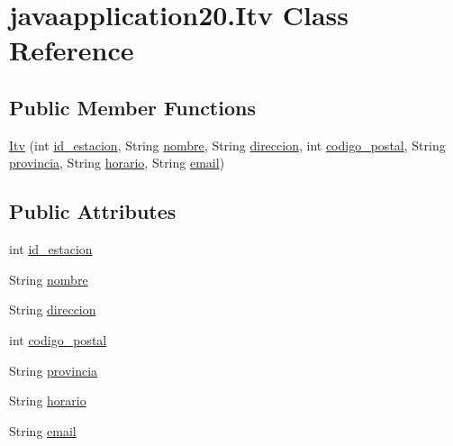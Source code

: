 \hypertarget{classjavaapplication20_1_1_itv}{}\section{javaapplication20.\+Itv Class Reference}
\label{classjavaapplication20_1_1_itv}
\subsection*{Public Member Functions}
\begin{DoxyCompactItemize}
\item 
\mbox{\hyperlink{classjavaapplication20_1_1_itv_aec26c068fcac7f03411d42f4ccf7d4f9}{Itv}} (int \mbox{\hyperlink{classjavaapplication20_1_1_itv_a53179feccb7b7c4a229bec01ae383095}{id\+\_\+estacion}}, String \mbox{\hyperlink{classjavaapplication20_1_1_itv_a434b35fff68f787e2f8749513cd16ae2}{nombre}}, String \mbox{\hyperlink{classjavaapplication20_1_1_itv_a4c9df6a015b90227f49bda05a7736b57}{direccion}}, int \mbox{\hyperlink{classjavaapplication20_1_1_itv_ab79a096724c62f0e1e39f30d6e1de9ef}{codigo\+\_\+postal}}, String \mbox{\hyperlink{classjavaapplication20_1_1_itv_aebc5fa721547c98375e99563f5482149}{provincia}}, String \mbox{\hyperlink{classjavaapplication20_1_1_itv_a851b71dd7586e47f2b1a50ece4fa0bd2}{horario}}, String \mbox{\hyperlink{classjavaapplication20_1_1_itv_ab42688c66f94923e77975aa99e0210d6}{email}})
\end{DoxyCompactItemize}
\subsection*{Public Attributes}
\begin{DoxyCompactItemize}
\item 
int \mbox{\hyperlink{classjavaapplication20_1_1_itv_a53179feccb7b7c4a229bec01ae383095}{id\+\_\+estacion}}
\item 
String \mbox{\hyperlink{classjavaapplication20_1_1_itv_a434b35fff68f787e2f8749513cd16ae2}{nombre}}
\item 
String \mbox{\hyperlink{classjavaapplication20_1_1_itv_a4c9df6a015b90227f49bda05a7736b57}{direccion}}
\item 
int \mbox{\hyperlink{classjavaapplication20_1_1_itv_ab79a096724c62f0e1e39f30d6e1de9ef}{codigo\+\_\+postal}}
\item 
String \mbox{\hyperlink{classjavaapplication20_1_1_itv_aebc5fa721547c98375e99563f5482149}{provincia}}
\item 
String \mbox{\hyperlink{classjavaapplication20_1_1_itv_a851b71dd7586e47f2b1a50ece4fa0bd2}{horario}}
\item 
String \mbox{\hyperlink{classjavaapplication20_1_1_itv_ab42688c66f94923e77975aa99e0210d6}{email}}
\end{DoxyCompactItemize}


